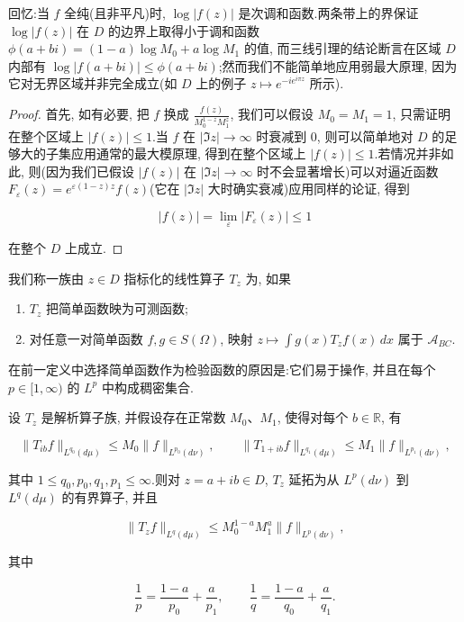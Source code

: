 \begin{remark*}
回忆:当 $f$ 全纯(且非平凡)时, $\log|f(z)|$ 是次调和函数.两条带上的界保证 $\log|f(z)|$ 在 $D$ 的边界上取得小于调和函数 $\phi(a+bi) = (1-a)\log M_0 + a\log M_1$ 的值, 而三线引理的结论断言在区域 $D$ 内部有 $\log|f(a+bi)| \le \phi(a+bi)$;然而我们不能简单地应用弱最大原理, 因为它对无界区域并非完全成立(如 $D$ 上的例子 $z\mapsto e^{-ie^{i\pi z}}$ 所示).
\end{remark*}

\begin{proof}
首先, 如有必要, 把 $f$ 换成 $\frac{f(z)}{M_0^{1-z}M_1^z}$, 我们可以假设 $M_0 = M_1 = 1$, 只需证明在整个区域上 $|f(z)|\le 1$.当 $f$ 在 $|\Im z|\to\infty$ 时衰减到 0, 则可以简单地对 $D$ 的足够大的子集应用通常的最大模原理, 得到在整个区域上 $|f(z)|\le 1$.若情况并非如此, 则(因为我们已假设 $|f(z)|$ 在 $|\Im z|\to\infty$ 时不会显著增长)可以对逼近函数 $F_\varepsilon(z) = e^{\varepsilon(1-z)z}f(z)$(它在 $|\Im z|$ 大时确实衰减)应用同样的论证, 得到

\[
|f(z)| = \lim_\varepsilon |F_\varepsilon(z)| \le 1
\]

在整个 $D$ 上成立.
\end{proof}


\begin{definition}\label{def:c6-1.6}
我们称一族由 $z\in D$ 指标化的线性算子 $T_z$ 为, 如果

\begin{enumerate}
\item $T_z$ 把简单函数映为可测函数;
\item 对任意一对简单函数 $f, g\in S(\Omega)$, 映射 $z\mapsto\int g(x)T_z f(x)\, dx$ 属于 $\mathcal{A}_{BC}$.
\end{enumerate}
\end{definition}

\begin{remark}\label{rem:c6-1.7}
在前一定义中选择简单函数作为检验函数的原因是:它们易于操作, 并且在每个 $p\in[1, \infty)$ 的 $L^p$ 中构成稠密集合.
\end{remark}

\begin{theorem}\label{thm:c6-1.8}
设 $T_z$ 是解析算子族, 并假设存在正常数 $M_0$、$M_1$, 使得对每个 $b\in\mathbb{R}$, 有

\[
\|T_{ib}f\|_{L^{q_0}(d\mu)} \le M_0\|f\|_{L^{p_0}(d\nu)}, \qquad \|T_{1+ib}f\|_{L^{q_1}(d\mu)} \le M_1\|f\|_{L^{p_1}(d\nu)},
\]

其中 $1\le q_0, p_0, q_1, p_1\le\infty$.则对 $z = a+ib\in D$, $T_z$ 延拓为从 $L^p(d\nu)$ 到 $L^q(d\mu)$ 的有界算子, 并且

\[
\|T_z f\|_{L^q(d\mu)} \le M_0^{1-a}M_1^a\|f\|_{L^p(d\nu)},
\]

其中

\[
\frac{1}{p} = \frac{1-a}{p_0} + \frac{a}{p_1}, \qquad \frac{1}{q} = \frac{1-a}{q_0} + \frac{a}{q_1}.
\]
\end{theorem}

